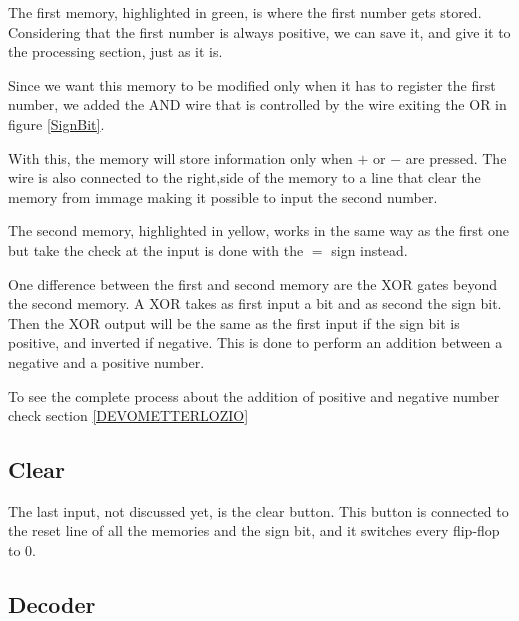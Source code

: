 \documentclass{article}
\begin{document}
\vspace{3mm}

The first memory, highlighted in green, is where the first number gets stored. Considering that the first number is always positive, we can save it, and give it to the processing section, just as it is. 

\vspace{1mm}

Since we want this memory to be modified only when it has to register the first number, we added the AND wire that is controlled by the wire exiting the OR in figure \ref{SignBit}. 

\vspace{1mm}

With this, the memory will store information only when $+$ or $-$ are pressed. The wire is also connected to the right,side of the memory to a line that clear the memory from immage%
making it possible to input the second number.

\vspace{3mm}

The second memory, highlighted in yellow, works in the same way as the first one but take the check at the input is done with the $=$ sign instead. %

One difference between the first and second memory are the XOR gates beyond the second memory. A XOR takes as first input a bit and as second the sign bit. Then the XOR output will be the same as the first input if the sign bit is positive, and inverted if negative. This is done to perform an addition between a negative and a positive number. 

\vspace{3mm}

To see the complete process about the addition of positive and negative number check section \ref{DEVOMETTERLOZIO}

\subsection{Clear}

The last input, not discussed yet, is the clear button. This button is connected to the reset line of all the memories and the sign bit, and it switches every flip-flop to 0. 

\clearpage
\subsection{Decoder}
\end{document}
